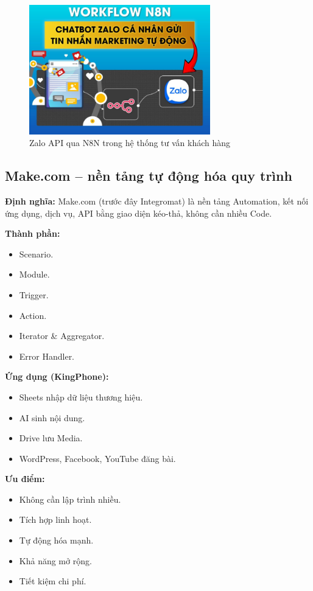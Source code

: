 \begin{figure}
    \centering
    \includegraphics[width=0.7\textwidth]{img/Picture3.png}

    \caption{Zalo API qua N8N trong hệ thống tư vấn khách hàng}
    \label{fig:zaloapi}
\end{figure}


\subsection{Make.com – nền tảng tự động hóa quy trình}

\textbf{Định nghĩa:} Make.com (trước đây Integromat) là nền tảng Automation, kết nối ứng dụng, dịch vụ, API bằng giao diện kéo-thả, không cần nhiều Code.

\textbf{Thành phần:}
\begin{itemize}
    \item Scenario.
    \item Module.
    \item Trigger.
    \item Action.
    \item Iterator \& Aggregator.
    \item Error Handler.
\end{itemize}

\textbf{Ứng dụng (KingPhone):}
\begin{itemize}
    \item Sheets nhập dữ liệu thương hiệu.
    \item AI sinh nội dung.
    \item Drive lưu Media.
    \item WordPress, Facebook, YouTube đăng bài.
\end{itemize}

\textbf{Ưu điểm:}
\begin{itemize}
    \item Không cần lập trình nhiều.
    \item Tích hợp linh hoạt.
    \item Tự động hóa mạnh.
    \item Khả năng mở rộng.
    \item Tiết kiệm chi phí.
\end{itemize}


